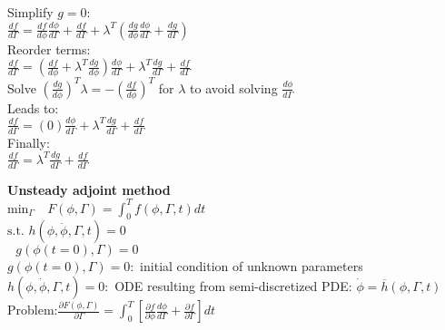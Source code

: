 \documentclass[10pt]{article} %
\begin{document}
\begin{Parallel}[v]{0.50\textwidth}{0.5\textwidth}
{\begin{center}
			Simplify $g=0$:\\
			$\frac{df}{d\Gamma} = \frac{df}{d\phi} \frac{d\phi}{d\Gamma} + \frac{df}{d\Gamma} + \lambda ^ T \left(\frac{dg}{d\phi} \frac{d\phi}{d\Gamma} + \frac{dg}{d\Gamma}\right)$\\
			Reorder terms:\\
			$\frac{df}{d\Gamma} = \left(\frac{df}{d\phi} + \lambda ^ T \frac{dg}{d\phi}\right) \frac{d\phi}{d\Gamma}  + \lambda ^ T \frac{dg}{d\Gamma} + \frac{df}{d\Gamma}$\\
			Solve $ \left(\frac{dg}{d\phi}\right)^T \lambda =  -\left(\frac{df}{d\phi}\right)^T $ for $\lambda$ to avoid solving $\frac{d\phi}{d\Gamma}$\\
			Leads to:\\
			$\frac{df}{d\Gamma} = \left(0\right) \frac{d\phi}{d\Gamma}  + \lambda ^ T \frac{dg}{d\Gamma} + \frac{df}{d\Gamma}$\\
			Finally:\\
			$\frac{df}{d\Gamma} =  \lambda ^ T \frac{dg}{d\Gamma} + \frac{df}{d\Gamma}$\\
		\end{center}
	}
	\ParallelPar
\end{Parallel}
\newpage
\begin{center}
	\textbf{Unsteady adjoint method}\\
	$\text{min}_\Gamma \quad F(\phi,\Gamma) = \int_{0}^{T} f(\phi,\Gamma,t) dt$\\
	$\text{s.t. } h(\phi,\dot \phi,\Gamma,t) = 0$\\
	$\text{     } g(\phi(t=0),\Gamma) = 0$\\
	$g(\phi(t=0),\Gamma)=0:$ initial condition of unknown parameters\\
	$h(\phi,\dot \phi,\Gamma,t) = 0:$ ODE resulting from semi-discretized PDE: $\dot \phi = \overline{h}(\phi,\Gamma,t)$\\
	Problem:$\frac{\partial F(\phi,\Gamma)}{\partial \Gamma} = \int _0 ^T \left[\frac{\partial f}{\partial \phi} \frac{d \phi}{d \Gamma} + \frac{\partial f}{\partial \Gamma}\right]dt $
\end{center}
\end{document}
